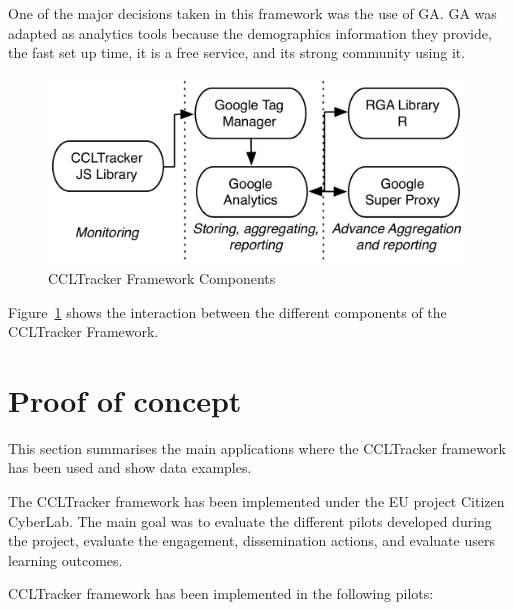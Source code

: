 \documentclass{article}
\begin{document}
One of the major decisions taken in this framework was the use of GA. GA was adapted as analytics tools because the demographics information they provide, the fast set up time, it is a free service, and its strong community using it. 



\begin{figure}[t]
  \begin{center}
		\includegraphics[width=11cm]{imgs/ccltrackerFramework.pdf}
  \end{center}
\caption{CCLTracker Framework Components}
\label{img:CCLTrackerFrameworkComponents}
\end{figure}

Figure~\ref{img:CCLTrackerFrameworkComponents} shows the interaction between the different components of the CCLTracker Framework. 




\section{Proof of concept}

This section summarises the main applications where the CCLTracker framework has been used and show data examples. 

The CCLTracker framework has been implemented under the EU project Citizen CyberLab. The main goal was to evaluate the different pilots developed during the project, evaluate the engagement, dissemination actions, and evaluate users learning outcomes.

CCLTracker framework has been implemented in the following pilots:
\end{document}
